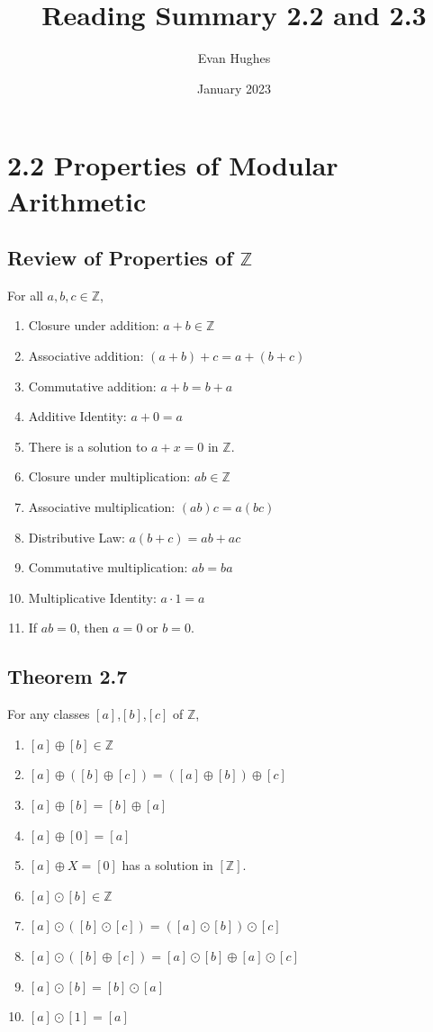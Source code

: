\documentclass{article}
\title{Reading Summary 2.2 and 2.3}
\author{Evan Hughes}
\date{January 2023}
\begin{document}
\maketitle
\section*{2.2 Properties of Modular Arithmetic}
\subsection*{Review of Properties of $\mathbb{Z}$}

For all $a, b, c \in \mathbb{Z}$,
\begin{enumerate}
    \item Closure under addition: $a + b \in \mathbb{Z}$
    \item Associative addition: $(a + b) + c = a + (b + c)$
    \item Commutative addition: $a + b = b + a$
    \item Additive Identity: $a + 0 = a$
    \item There is a solution to $a + x = 0$ in $\mathbb{Z}$.
    \item Closure under multiplication: $ab \in \mathbb{Z}$
    \item Associative multiplication: $(ab)c = a(bc)$
    \item Distributive Law: $a(b + c) = ab + ac$
    \item Commutative multiplication: $ab = ba$
    \item Multiplicative Identity: $a \cdot 1 = a$
    \item If $ab=0$, then $a=0$ or $b=0$.
\end{enumerate}

\subsection*{Theorem 2.7}
For any classes $[a]$,$[b]$,$[c]$ of $\mathbb{Z}$,
\begin{enumerate}
    \item $[a] \oplus [b] \in \mathbb{Z}$
    \item $[a] \oplus ([b] \oplus [c]) = ([a] \oplus [b]) \oplus [c]$
    \item $[a] \oplus [b] = [b] \oplus [a]$
    \item $[a] \oplus [0] = [a]$
    \item $[a] \oplus X = [0]$ has a solution in $[\mathbb{Z}]$.
    \item $[a] \odot [b] \in \mathbb{Z}$
    \item $[a] \odot ([b] \odot [c]) = ([a] \odot [b]) \odot [c]$
    \item $[a] \odot ([b] \oplus [c]) = [a] \odot [b] \oplus [a] \odot [c]$
    \item $[a] \odot [b] = [b] \odot [a]$
    \item $[a] \odot [1] = [a]$
\end{enumerate}
\end{document}
